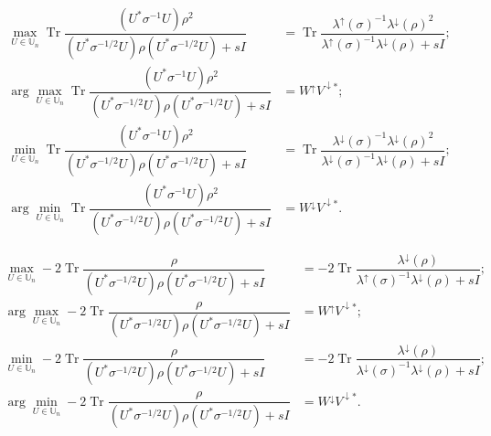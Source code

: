 \documentclass[10pt,a4paper]{amsart}
\begin{document}
\begin{claim}\label{claimA} 
\begin{align*}
\max_{U\in\mathbb U_n} \operatorname{Tr}\dfrac{(U^*\sigma^{-1}U)\rho^2}{(U^*\sigma^{-1/2}U)\rho(U^*\sigma^{-1/2}U)+sI}&=\operatorname{Tr}\dfrac{\lambda^\uparrow(\sigma)^{-1}\lambda^\downarrow(\rho)^2}{\lambda^\uparrow(\sigma)^{-1}\lambda^\downarrow(\rho) +s I};\\
\arg\max_{U\in \mathbb U_n}\operatorname{Tr}\dfrac{(U^*\sigma^{-1}U)\rho^2}{(U^*\sigma^{-1/2}U)\rho(U^*\sigma^{-1/2}U)+sI}&=W^\uparrow V^{\downarrow*};\\
\min_{U\in\mathbb U_n}\operatorname{Tr}\dfrac{(U^*\sigma^{-1}U)\rho^2}{(U^*\sigma^{-1/2}U)\rho(U^*\sigma^{-1/2}U)+sI}&= \operatorname{Tr}\dfrac{\lambda^\downarrow(\sigma)^{-1}\lambda^\downarrow(\rho)^2}{\lambda^\downarrow(\sigma)^{-1}\lambda^\downarrow(\rho) +s I};\\
\arg\min_{U\in \mathbb U_n} \operatorname{Tr}\dfrac{(U^*\sigma^{-1}U)\rho^2}{(U^*\sigma^{-1/2}U)\rho(U^*\sigma^{-1/2}U)+sI}&=W^\downarrow V^{\downarrow*}.
\end{align*}
\end{claim}

\begin{claim}\label{claimrho}
\begin{align*}
\max_{U\in\mathbb U_n} -2 \operatorname{Tr}\dfrac{\rho}{(U^*\sigma^{-1/2}U)\rho(U^*\sigma^{-1/2}U)+sI}&=-2\operatorname{Tr}\dfrac{\lambda^\downarrow(\rho)}{\lambda^\uparrow(\sigma)^{-1}\lambda^\downarrow(\rho)+sI};\\
\arg\max_{U\in\mathbb U_n} -2 \operatorname{Tr}\dfrac{\rho}{(U^*\sigma^{-1/2}U)\rho(U^*\sigma^{-1/2}U)+sI}&=W^\uparrow V^{\downarrow*};\\
\min_{U\in\mathbb U_n} -2 \operatorname{Tr}\dfrac{\rho}{(U^*\sigma^{-1/2}U)\rho(U^*\sigma^{-1/2}U)+sI}&=-2\operatorname{Tr}\dfrac{\lambda^\downarrow(\rho)}{\lambda^\downarrow(\sigma)^{-1}\lambda^\downarrow(\rho)+sI};\\
\arg\min_{U\in\mathbb U_n} -2 \operatorname{Tr}\dfrac{\rho}{(U^*\sigma^{-1/2}U)\rho(U^*\sigma^{-1/2}U)+sI}&=W^\downarrow V^{\downarrow*}.
\end{align*}
\end{claim}
\end{document}
